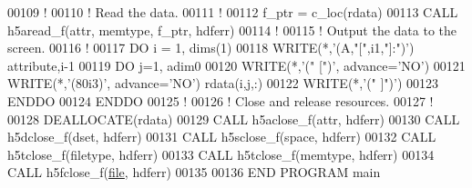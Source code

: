 \begin{DoxyCode}
00109   \textcolor{comment}{!}
00110   \textcolor{comment}{! Read the data.}
00111   \textcolor{comment}{!}
00112   f\_ptr = c\_loc(rdata)
00113   \textcolor{keyword}{CALL }h5aread\_f(attr, memtype, f\_ptr, hdferr)
00114   \textcolor{comment}{!}
00115   \textcolor{comment}{! Output the data to the screen.}
00116   \textcolor{comment}{!}
00117   \textcolor{keywordflow}{DO} i = 1, dims(1)
00118      \textcolor{keyword}{WRITE}(*,\textcolor{stringliteral}{'(A,"[",i1,"]:")'}) attribute,i-1
00119      \textcolor{keywordflow}{DO} j=1, adim0
00120         \textcolor{keyword}{WRITE}(*,\textcolor{stringliteral}{'(" [")'}, advance=\textcolor{stringliteral}{'NO'})
00121         \textcolor{keyword}{WRITE}(*,\textcolor{stringliteral}{'(80i3)'}, advance=\textcolor{stringliteral}{'NO'}) rdata(i,j,:)
00122         \textcolor{keyword}{WRITE}(*,\textcolor{stringliteral}{'(" ]")'})
00123 \textcolor{keywordflow}{     ENDDO}
00124 \textcolor{keywordflow}{  ENDDO}
00125   \textcolor{comment}{!}
00126   \textcolor{comment}{! Close and release resources.}
00127   \textcolor{comment}{!}
00128   \textcolor{keyword}{DEALLOCATE}(rdata)
00129   \textcolor{keyword}{CALL }h5aclose\_f(attr, hdferr)
00130   \textcolor{keyword}{CALL }h5dclose\_f(dset, hdferr)
00131   \textcolor{keyword}{CALL }h5sclose\_f(space, hdferr)
00132   \textcolor{keyword}{CALL }h5tclose\_f(filetype, hdferr)
00133   \textcolor{keyword}{CALL }h5tclose\_f(memtype, hdferr)
00134   \textcolor{keyword}{CALL }h5fclose\_f(\hyperlink{structfile}{file}, hdferr)
00135 
00136 \textcolor{keyword}{END PROGRAM }main
\end{DoxyCode}
